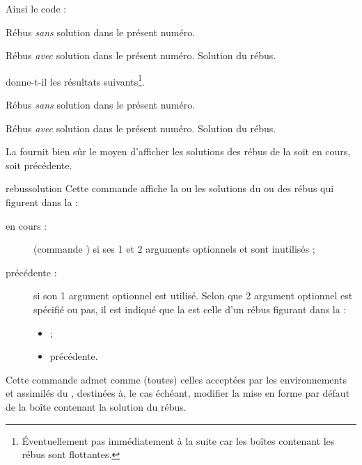 \documentclass{letgut}
\begin{document}
Ainsi le code :

\begin{ltx-code}[title addon=rébus]
\begin{rebus}[no solution]
  Rébus \emph{sans} solution dans le présent numéro.
\end{rebus}
\begin{rebus}
  Rébus \emph{avec} solution dans le présent numéro.
  \solution
  Solution du rébus.
\end{rebus}
\end{ltx-code}

donne-t-il les résultats suivants\footnote{Éventuellement pas immédiatement à la
  suite car les boîtes contenant les rébus sont flottantes.}.

\begin{rebus}
  Rébus \emph{sans} solution dans le présent numéro.
\end{rebus}
\begin{rebus}[nofloat]
  Rébus \emph{avec} solution dans le présent numéro.
  \solution
  Solution du rébus.
\end{rebus}

La  fournit bien sûr le moyen d'afficher les solutions des rébus de
la 
soit en cours, soit précédente.

\begin{docCommand}[doc new={2023-01-14}]{rebussolution}{}
  Cette commande affiche la ou les solutions du ou des rébus qui figurent dans
  la  :
  \begin{description}
  \item[en cours :] (commande ) si ses 1\ier{} et
    2\ieme{} arguments optionnels  et  sont
    inutilisés ;
  \item[précédente :] si son 1\ier{} argument optionnel  est
    utilisé. Selon que 2\ieme{} argument optionnel  est spécifié ou
    pas, il est indiqué que la  est celle d'un rébus figurant
    dans la  :
    \begin{itemize}
    \item {} ;
    \item précédente.
    \end{itemize}
  \end{description}
  Cette commande admet comme  (toutes) celles acceptées par les
  environnements  et assimilés du ,
  destinées à, le cas échéant, modifier la mise en forme par défaut de la boîte
  contenant la solution du rébus.
\end{docCommand}
\end{document}
